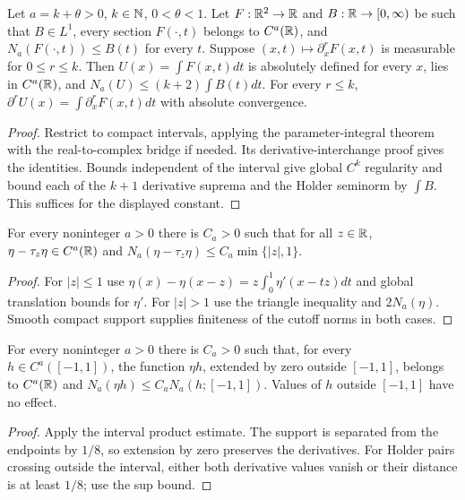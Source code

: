 \begin{lemma}
  \label{lem:c12_holder_integral}
  Let $a=k+\theta>0$, $k\in\mathbb{N}$, $0<\theta<1$. Let $F:\mathbb{R}^2\to\mathbb{R}$ and
  $B:\mathbb{R}\to[0,\infty)$ be such that $B\in L^1$, every section $F(\cdot,t)$ belongs to
  $C^a(\mathbb{R})$, and $N_a(F(\cdot,t))\le B(t)$ for every $t$.
  Suppose $(x,t)\mapsto\partial_x^rF(x,t)$ is measurable for $0\le r\le k$.
  Then $U(x)=\int F(x,t)dt$ is absolutely defined for every $x$, lies in $C^a(\mathbb{R})$,
  and $N_a(U)\le(k+2)\int B(t)dt$.
  For every $r\le k$, $\partial^rU(x)=\int\partial_x^rF(x,t)dt$ with absolute convergence.
\end{lemma}
\begin{proof}
  Restrict to compact intervals, applying the parameter-integral theorem with the
  real-to-complex bridge if needed. Its derivative-interchange proof gives the identities.
  Bounds independent of the interval give global $C^k$ regularity and bound each of the $k+1$
  derivative suprema and the Holder seminorm by $\int B$. This suffices for the displayed constant.
\end{proof}

\begin{lemma}
  \label{lem:c12_cutoff_difference}
  For every noninteger $a>0$ there is $C_a>0$ such that for all $z\in\mathbb{R}$,
  $\eta-\tau_z\eta\in C^a(\mathbb{R})$ and
  $N_a(\eta-\tau_z\eta)\le C_a\min\{|z|,1\}$.
\end{lemma}
\begin{proof}
  For $|z|\le1$ use $\eta(x)-\eta(x-z)=z\int_0^1\eta'(x-tz)dt$ and global translation
  bounds for $\eta'$. For $|z|>1$ use the triangle inequality and $2N_a(\eta)$.
  Smooth compact support supplies finiteness of the cutoff norms in both cases.
\end{proof}

\begin{lemma}
  \label{lem:c12_cutoff_extension}
  For every noninteger $a>0$ there is $C_a>0$ such that, for every
  $h\in C^a([-1,1])$, the function $\eta h$, extended by zero outside $[-1,1]$,
  belongs to $C^a(\mathbb{R})$ and $N_a(\eta h)\le C_aN_a(h;[-1,1])$.
  Values of $h$ outside $[-1,1]$ have no effect.
\end{lemma}
\begin{proof}
  Apply the interval product estimate. The support is separated from the endpoints by $1/8$,
  so extension by zero preserves the derivatives. For Holder pairs crossing outside the interval,
  either both derivative values vanish or their distance is at least $1/8$; use the sup bound.
\end{proof}

